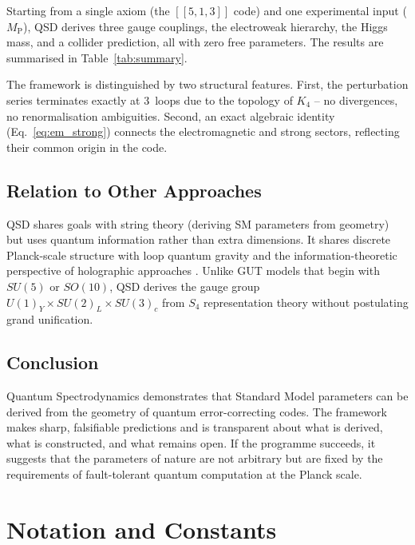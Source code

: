 \documentclass[11pt,a4paper]{article}
\theoremstyle{definition}
\newcommand{\Mpl}{M_{\mathrm{P}}}
\begin{document}
Starting from a single axiom (the $[[5,1,3]]$ code) and one experimental input ($\Mpl$), QSD derives three gauge couplings, the electroweak hierarchy, the Higgs mass, and a collider prediction, all with zero free parameters. The results are summarised in Table~\ref{tab:summary}.

The framework is distinguished by two structural features. First, the perturbation series terminates exactly at 3~loops due to the topology of $K_4$ -- no divergences, no renormalisation ambiguities. Second, an exact algebraic identity (Eq.~\ref{eq:em_strong}) connects the electromagnetic and strong sectors, reflecting their common origin in the code.

\subsection{Relation to Other Approaches}

QSD shares goals with string theory (deriving SM parameters from geometry) but uses quantum information rather than extra dimensions. It shares discrete Planck-scale structure with loop quantum gravity and the information-theoretic perspective of holographic approaches \cite{Almheiri2015,Pastawski2015}. Unlike GUT models that begin with $SU(5)$ or $SO(10)$, QSD derives the gauge group $U(1)_Y \times SU(2)_L \times SU(3)_c$ from $S_4$ representation theory without postulating grand unification.

\subsection{Conclusion}

Quantum Spectrodynamics demonstrates that Standard Model parameters can be derived from the geometry of quantum error-correcting codes. The framework makes sharp, falsifiable predictions and is transparent about what is derived, what is constructed, and what remains open. If the programme succeeds, it suggests that the parameters of nature are not arbitrary but are fixed by the requirements of fault-tolerant quantum computation at the Planck scale.

\newpage
\appendix

\section{Notation and Constants}
\label{app:notation}
\end{document}
